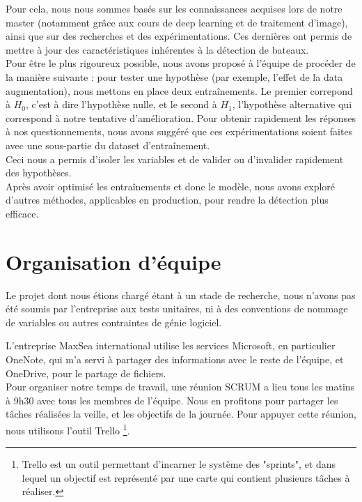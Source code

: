 Pour cela, nous nous sommes basés sur les connaissances acquises lors de notre master (notamment grâce aux cours
de deep learning et de traitement d'image), ainsi que sur des recherches et des expérimentations.
Ces dernières ont permis de mettre à jour des caractéristiques inhérentes à la détection de bateaux. \\

Pour être le plus rigoureux possible, nous avons proposé à l'équipe de procéder de la manière suivante :
pour tester une hypothèse (par exemple, l'effet de la data augmentation), nous mettons en place deux entraînements. 
Le premier correpond à \(H_{0}\), c'est à dire l'hypothèse nulle, et le second à \(H_{1}\), l'hypothèse
alternative qui correspond à notre tentative d'amélioration. Pour obtenir rapidement les réponses à 
nos questionnements, nous avons suggéré que ces expérimentations soient faites avec une sous-partie 
du dataset d'entraînement. \\

Ceci nous a permis d'isoler les variables et de valider ou d'invalider rapidement des hypothèses.\\

Après avoir optimisé les entraînements et donc le modèle, nous avons exploré d'autres méthodes, applicables en production,
pour rendre la détection plus efficace.



\section{Organisation d'équipe}


Le projet dont nous étions chargé étant à un stade de recherche, nous n'avons 
pas été soumis par l'entreprise aux tests unitaires,
ni à des conventions de nommage de variables ou autres contraintes de génie logiciel.

L'entreprise MaxSea international utilise les services Microsoft, en particulier OneNote,
qui m'a servi à partager des informations avec le reste de l'équipe, et OneDrive,
pour le partage de fichiers.\\

Pour organiser notre temps de travail, une réunion SCRUM a lieu tous les matins à 9h30 avec
tous les membres de l'équipe. Nous en profitons pour partager les tâches réalisées la veille,
et les objectifs de la journée. Pour appuyer cette réunion, nous utilisons l'outil Trello \footnote{Trello est
un outil permettant d'incarner le système des "sprints", et dans lequel un objectif est représenté par
une carte qui contient plusieurs tâches à réaliser.}.\\

